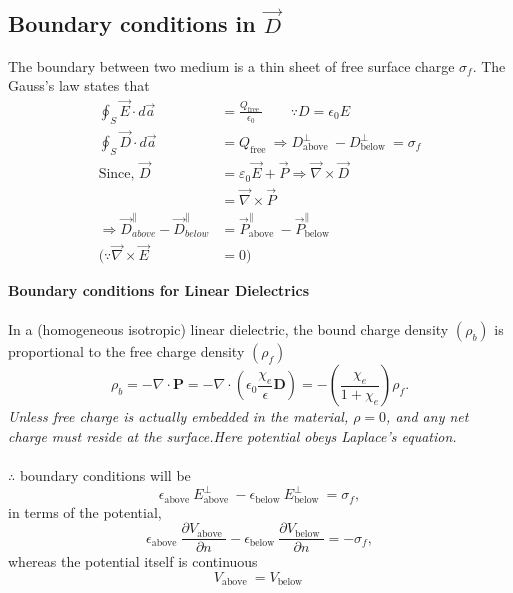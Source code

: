  \subsection{Boundary conditions in $\vec{D}$}
 The boundary between two medium is a
 thin sheet of free surface charge $\sigma_{f}$.
 The Gauss's law states that
  \begin{align*}
  \oint_{S} \vec{E}\cdot d \vec{a}&=\frac{Q_{\text {free }}}{\epsilon_{0}} \qquad \because D= {\epsilon_{0}}E\\
  \oint_{S} \vec{D}\cdot d \vec{a}&=Q_{\text {free }} \Rightarrow D_{\text {above }}^{\perp}-D_{\text {below }}^{\perp}=\sigma_{f}\\
 \text{Since, }
 \vec{D}&=\varepsilon_{0} \vec{E}+\vec{P} \Rightarrow \vec{\nabla} \times \vec{D}\\&=\vec{\nabla} \times \vec{P}\\
 \Rightarrow \vec{D}_{a b o v e}^{\|}-\vec{D}_{b e l o w}^{\|}&=\vec{P}_{\text {above }}^{\|}-\vec{P}_{\text {below }}^{\|} \\
 (\because \vec{\nabla} \times \vec{E}&=0)
 \end{align*}
 \begin{center}
 \end{center}
\textbf{Boundary conditions for Linear Dielectrics}\\\\
In a (homogeneous isotropic) linear dielectric, the bound charge density $\left(\rho_{b}\right)$ is proportional to the free charge density $\left(\rho_{f}\right)$
$$
\rho_{b}=-\nabla \cdot \mathbf{P}=-\nabla \cdot\left(\epsilon_{0} \frac{\chi_{e}}{\epsilon} \mathbf{D}\right)=-\left(\frac{\chi_{e}}{1+\chi_{e}}\right) \rho_{f} .
$$
\textit{Unless free charge is actually embedded in the material, $\rho=0$, and any net charge must reside at the surface.Here potential obeys Laplace's equation.}\\\\$\therefore$  boundary conditions will be
$$
\epsilon_{\text {above }} E_{\text {above }}^{\perp}-\epsilon_{\text {below }} E_{\text {below }}^{\perp}=\sigma_{f},
$$
in terms of the potential,
$$
\epsilon_{\text {above }} \frac{\partial V_{\text {above }}}{\partial n}-\epsilon_{\text {below }} \frac{\partial V_{\text {below }}}{\partial n}=-\sigma_{f},
$$
whereas the potential itself is continuous
$$
V_{\text {above }}=V_{\text {below }}
$$

